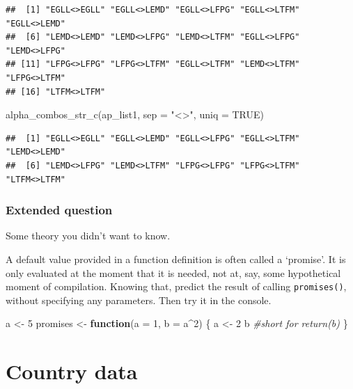 \documentclass[
]{book}
\newenvironment{Shaded}{\begin{snugshade}}{\end{snugshade}}
\newcommand{\AttributeTok}[1]{\textcolor[rgb]{0.77,0.63,0.00}{#1}}
\newcommand{\CommentTok}[1]{\textcolor[rgb]{0.56,0.35,0.01}{\textit{#1}}}
\newcommand{\ConstantTok}[1]{\textcolor[rgb]{0.00,0.00,0.00}{#1}}
\newcommand{\ControlFlowTok}[1]{\textcolor[rgb]{0.13,0.29,0.53}{\textbf{#1}}}
\newcommand{\DecValTok}[1]{\textcolor[rgb]{0.00,0.00,0.81}{#1}}
\newcommand{\FunctionTok}[1]{\textcolor[rgb]{0.00,0.00,0.00}{#1}}
\newcommand{\NormalTok}[1]{#1}
\newcommand{\OtherTok}[1]{\textcolor[rgb]{0.56,0.35,0.01}{#1}}
\newcommand{\SpecialCharTok}[1]{\textcolor[rgb]{0.00,0.00,0.00}{#1}}
\newcommand{\StringTok}[1]{\textcolor[rgb]{0.31,0.60,0.02}{#1}}
\begin{document}
\begin{verbatim}
##  [1] "EGLL<>EGLL" "EGLL<>LEMD" "EGLL<>LFPG" "EGLL<>LTFM" "EGLL<>LEMD"
##  [6] "LEMD<>LEMD" "LEMD<>LFPG" "LEMD<>LTFM" "EGLL<>LFPG" "LEMD<>LFPG"
## [11] "LFPG<>LFPG" "LFPG<>LTFM" "EGLL<>LTFM" "LEMD<>LTFM" "LFPG<>LTFM"
## [16] "LTFM<>LTFM"
\end{verbatim}

\begin{Shaded}
\begin{Highlighting}[]
\FunctionTok{alpha\_combos\_str\_c}\NormalTok{(ap\_list1, }\AttributeTok{sep =} \StringTok{"\textless{}\textgreater{}"}\NormalTok{, }\AttributeTok{uniq =} \ConstantTok{TRUE}\NormalTok{)}
\end{Highlighting}
\end{Shaded}

\begin{verbatim}
##  [1] "EGLL<>EGLL" "EGLL<>LEMD" "EGLL<>LFPG" "EGLL<>LTFM" "LEMD<>LEMD"
##  [6] "LEMD<>LFPG" "LEMD<>LTFM" "LFPG<>LFPG" "LFPG<>LTFM" "LTFM<>LTFM"
\end{verbatim}

\hypertarget{extended-question}{%
\subsubsection{Extended question}\label{extended-question}}

Some theory you didn't want to know.

A default value provided in a function definition is often called a `promise'. It is only evaluated at the moment that it is needed, not at, say, some hypothetical moment of compilation. Knowing that, predict the result of calling \texttt{promises()}, without specifying any parameters. Then try it in the console.

\begin{Shaded}
\begin{Highlighting}[]
\NormalTok{a }\OtherTok{\textless{}{-}} \DecValTok{5}
\NormalTok{promises }\OtherTok{\textless{}{-}} \ControlFlowTok{function}\NormalTok{(}\AttributeTok{a =} \DecValTok{1}\NormalTok{, }\AttributeTok{b =}\NormalTok{ a}\SpecialCharTok{\^{}}\DecValTok{2}\NormalTok{) \{}
\NormalTok{  a }\OtherTok{\textless{}{-}} \DecValTok{2}
\NormalTok{  b }\CommentTok{\#short for return(b)}
\NormalTok{\}}
\end{Highlighting}
\end{Shaded}

\hypertarget{country-data}{%
\section{Country data}\label{country-data}}
\end{document}
